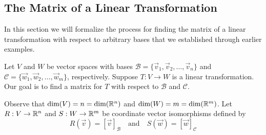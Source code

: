 \documentclass{ximera}
\begin{document}
\subsection{The Matrix of a Linear Transformation}
In this section we will formalize the process for finding the matrix of a linear transformation with respect to arbitrary bases that we established through earlier examples.

Let $V$ and $W$ be vector spaces with bases $\mathcal{B}=\{\vec{v}_1, \vec{v}_2,\ldots ,\vec{v}_n\}$ and $\mathcal{C}=\{\vec{w}_1, \vec{w}_2,\ldots ,\vec{w}_m\}$, respectively.   Suppose $T:V\rightarrow W$ is a linear transformation.  Our goal is to find a matrix for $T$ with respect to $\mathcal{B}$ and $\mathcal{C}$.

Observe that $\text{dim}(V)=n=\text{dim}(\mathbb{R}^n)$ and $\text{dim}(W)=m=\text{dim}(\mathbb{R}^m)$. Let $R:V\rightarrow \mathbb{R}^n$ and $S:W\rightarrow \mathbb{R}^m$ be coordinate vector isomorphisms defined by
$$R(\vec{v})=[\vec{v}]_{\mathcal{B}}\quad\text{and}\quad S(\vec{w})=[\vec{w}]_{\mathcal{C}}$$



\end{document}
